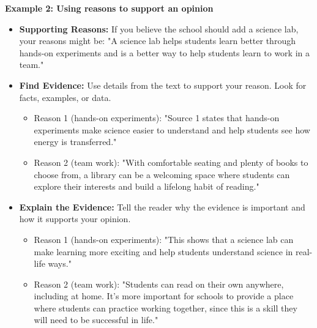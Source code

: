 \documentclass[12pt]{article}
\begin{document}
\begin{tcolorbox}[colframe=black!60, colback=white, 
coltitle=black, colbacktitle=black!15, fonttitle=\bfseries\Large, 
title=Examples, halign title=center, left=10pt, right=10pt, top=10pt, bottom=15pt]

\textbf{Example 2: Using reasons to support an opinion}
\begin{itemize}
    \item \textbf{Supporting Reasons:}  If you believe the school should add a science lab, your reasons might be: "A science lab helps students learn better through hands-on experiments and is a better way to help students learn to work in a team."


                      \item \textbf{Find Evidence:} Use details from the text to support your reason. Look for facts, examples, or data. 
                      \begin{itemize}
                          \item  Reason 1 (hands-on experiments): "Source 1 states that hands-on experiments make science easier to understand and help students see how energy is transferred."
                          \item Reason 2 (team work): "With comfortable seating and plenty of books to choose from, a library can be a welcoming space where students can explore their interests and build a lifelong habit of reading."
                      \end{itemize}


            \item \textbf{Explain the Evidence:} Tell the reader why the evidence is important and how it supports your opinion.
            \begin{itemize}
                \item  Reason 1 (hands-on experiments): "This shows that a science lab can make learning more exciting and help students understand science in real-life ways."
                \item Reason 2 (team work): "Students can read on their own anywhere, including at home. It's more important for schools to provide a place where students can practice working together, since this is a skill they will need to be successful in life."
            \end{itemize}



        \end{itemize}


\end{tcolorbox}
\end{document}
